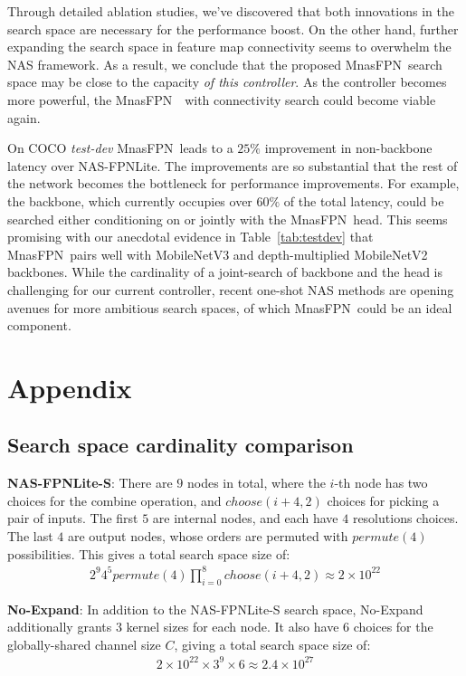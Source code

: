 \documentclass[10pt,twocolumn,letterpaper]{article}
\def\Mnasfpn{MnasFPN~}
\begin{document}
Through detailed ablation studies, we've discovered that both innovations in the search space are necessary for the performance boost. On the other hand, further expanding the search space in feature map connectivity seems to overwhelm the NAS framework. As a result, we conclude that the proposed \Mnasfpn search space may be close to the capacity {\it of this controller}. As the controller becomes more powerful, the \Mnasfpn~with connectivity search could become viable again. 

On COCO {\it test-dev} \Mnasfpn leads to a $25\%$ improvement in non-backbone latency over NAS-FPNLite. The improvements are so substantial that the rest of the network becomes the bottleneck for performance improvements. For example, the backbone, which currently occupies over $60\%$ of the total latency, could be searched either conditioning on or jointly with the \Mnasfpn head. This seems promising with our anecdotal evidence in Table~\ref{tab:testdev} that \Mnasfpn pairs well with MobileNetV3 and depth-multiplied MobileNetV2 backbones. While the cardinality of a joint-search of backbone and the head is challenging for our current controller, recent one-shot NAS methods are opening avenues for more ambitious search spaces, of which \Mnasfpn could be an ideal component.



 
{\small


}
\appendix

\section{Appendix}
\subsection{Search space cardinality comparison}
\label{sec:search_space_size}
{\bf NAS-FPNLite-S}: There are $9$ nodes in total, where the $i$-th node has two choices for the combine operation, and $choose(i+4, 2)$ choices for picking a pair of inputs. The first $5$ are internal nodes, and each have $4$ resolutions choices. The last $4$ are output nodes, whose orders are permuted with $permute(4)$ possibilities. This gives a total search space size of:
\begin{align*}
    2^9 4^5 permute(4) \prod_{i=0}^8 choose(i+4, 2) \approx 2\times 10^{22}
\end{align*}

{\bf No-Expand}: In addition to the NAS-FPNLite-S search space, No-Expand additionally grants $3$ kernel sizes for each node. It also have $6$ choices for the globally-shared channel size $C$, giving a total search space size of:
\begin{align*}
    2\times 10^{22} \times 3^{9} \times 6 \approx 2.4 \times 10^{27}
\end{align*}
\end{document}

